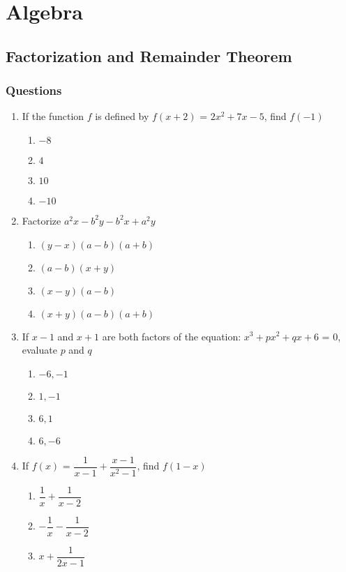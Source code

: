 \chapter{Algebra}
\section{Factorization and Remainder Theorem}
\subsection{Questions}
\begin{multicols}{2}
\begin{enumerate}[label={\arabic*.}]
\item If the function \(f\) is defined by \(f(x+2)\) = \(2{x}^{2} + 7x -5\), find \(f(-1)\)
	\begin{enumerate}[label={\Alph*.}]
	\item \(-8\)
	\item \(4\)
	\item \(10\)
	\item \(-10\)
	\end{enumerate}
\item Factorize \(a^2x - b^2y - b^2x + a^2y\)
	\begin{enumerate}[label={\Alph*.}]
	\item \((y-x)(a-b)(a+b)\)
	\item \((a-b)(x+y)\)
	\item \((x-y)(a-b)\)
	\item \((x+y)(a-b)(a+b)\)
	\end{enumerate}
\item If \(x - 1\) and \(x + 1\) are both factors of the equation: \({x}^{3} + p{x}^{2} + qx + 6 \) = 0, 
evaluate $p$ and $q$
	\begin{enumerate}[label={\Alph*.}]
	\item \(-6, -1\)
	\item \(1, -1\)
	\item \(6, 1\)
	\item \(6, -6\)
	\end{enumerate}
\item If \(f(x)\) = \(\dfrac{1}{x - 1} + \dfrac{x - 1}{{x}^{2} - 1}\), find \(f(1 - x)\)
	\begin{enumerate}[label={\Alph*.}]
	\item \(\dfrac{1}{x} + \dfrac{1}{x - 2}\)
	\item \( -\dfrac{1}{x} - \dfrac{1}{x - 2}\)
	\item \(x + \dfrac{1}{2x - 1}\)

\end{enumerate}
\end{enumerate}
\end{multicols}
